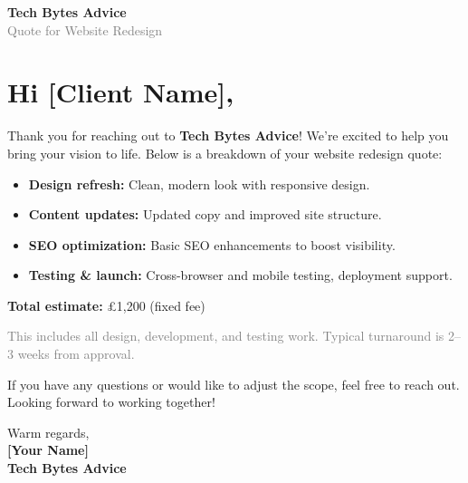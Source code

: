 \documentclass[11pt]{article}
\begin{document}
\begin{center}
    {\LARGE \textbf{Tech Bytes Advice}}\\[0.5em]
    \textcolor{graytext}{\large Quote for Website Redesign}
\end{center}

\vspace{1cm}

\section*{Hi [Client Name],}

Thank you for reaching out to \textbf{Tech Bytes Advice}! We're excited to help you bring your vision to life. Below is a breakdown of your website redesign quote:

\vspace{1em}

\begin{itemize}[leftmargin=1.5em]
    \item \textbf{Design refresh:} Clean, modern look with responsive design.
    \item \textbf{Content updates:} Updated copy and improved site structure.
    \item \textbf{SEO optimization:} Basic SEO enhancements to boost visibility.
    \item \textbf{Testing \& launch:} Cross-browser and mobile testing, deployment support.
\end{itemize}

\vspace{1em}

\textbf{Total estimate:} \pounds1,200 (fixed fee)

\textcolor{graytext}{This includes all design, development, and testing work. Typical turnaround is 2--3 weeks from approval.}

\vspace{2em}

\begin{center}
\end{center}

\vspace{2em}

If you have any questions or would like to adjust the scope, feel free to reach out. Looking forward to working together!

\vspace{2em}

Warm regards, \\
\textbf{[Your Name]} \\
\textbf{Tech Bytes Advice}
\end{document}

